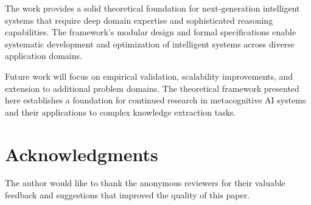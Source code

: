 \documentclass[12pt,a4paper]{article}
\begin{document}
The work provides a solid theoretical foundation for next-generation intelligent systems that require deep domain expertise and sophisticated reasoning capabilities. The framework's modular design and formal specifications enable systematic development and optimization of intelligent systems across diverse application domains.

Future work will focus on empirical validation, scalability improvements, and extension to additional problem domains. The theoretical framework presented here establishes a foundation for continued research in metacognitive AI systems and their applications to complex knowledge extraction tasks.

\section*{Acknowledgments}

The author would like to thank the anonymous reviewers for their valuable feedback and suggestions that improved the quality of this paper.
\end{document}
